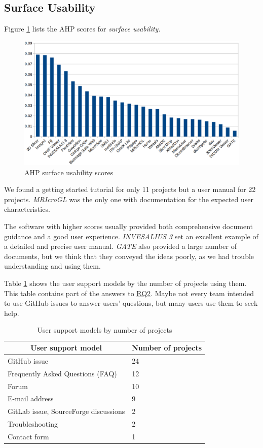 \documentclass[3p, 12pt,authoryear]{elsarticle}
\begin{document}
\subsection{Surface Usability} \label{sec_result_usability}

Figure \ref{fg_usability_scores} lists the AHP scores for \textit{surface
usability}.

\begin{figure}[ht]
\includegraphics[scale=0.38]{figures/usability_scores.png}
\caption{AHP surface usability scores}
\label{fg_usability_scores}
\end{figure}

We found a getting started tutorial for only 11 projects but a user manual for
22 projects. \textit{MRIcroGL} was the only one with documentation for the
expected user characteristics.

The software with higher scores usually provided both comprehensive document
guidance and a good user experience. \textit{INVESALIUS 3} set an excellent
example of a detailed and precise user manual. \textit{GATE} also provided a
large number of documents, but we think that they conveyed the ideas poorly, as
we had trouble understanding and using them.
 
Table \ref{tab_user_support_model} shows the user support models by the number
of projects using them. This table contains part of the answers to
\hyperlink{rq2}{RQ2}. Maybe not every team intended to use GitHub issues to
answer users' questions, but many users use them to seek help.

\begin{table}[ht]
\centering
\begin{tabular}{ll}
\hline
\multicolumn{1}{c}{User support model} & Number of projects \\ \hline
GitHub issue & 24 \\
Frequently Asked Questions (FAQ) & 12 \\
Forum & 10 \\
E-mail address & 9 \\
GitLab issue, SourceForge discussions & 2 \\
Troubleshooting & 2 \\
Contact form & 1 \\ \hline
\end{tabular}
\caption{\label{tab_user_support_model}User support models by number of projects}
\end{table}
\end{document}
